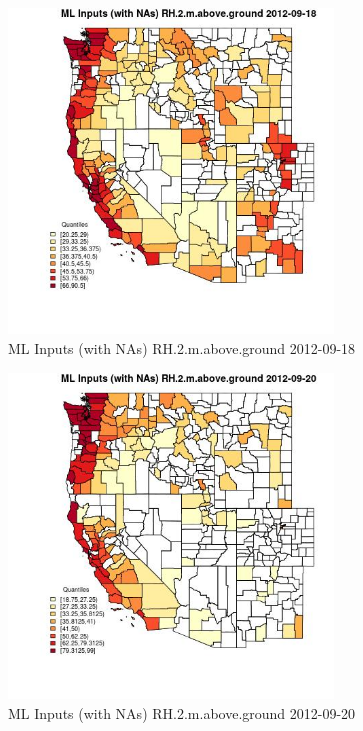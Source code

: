 \begin{figure} 
\centering  
\includegraphics[width=0.77\textwidth]{Code_Outputs/Report_ML_input_PM25_Step4_part_e_de_duplicated_aves_compiled_2019-05-14wNAs_CountyRH2mabovegroundMean2012-09-18_2012-09-18.jpg} 
\caption{\label{fig:Report_ML_input_PM25_Step4_part_e_de_duplicated_aves_compiled_2019-05-14wNAsCountyRH2mabovegroundMean2012-09-18_2012-09-18}ML Inputs (with NAs) RH.2.m.above.ground 2012-09-18} 
\end{figure} 
 

\clearpage 

\begin{figure} 
\centering  
\includegraphics[width=0.77\textwidth]{Code_Outputs/Report_ML_input_PM25_Step4_part_e_de_duplicated_aves_compiled_2019-05-14wNAs_CountyRH2mabovegroundMean2012-09-20_2012-09-20.jpg} 
\caption{\label{fig:Report_ML_input_PM25_Step4_part_e_de_duplicated_aves_compiled_2019-05-14wNAsCountyRH2mabovegroundMean2012-09-20_2012-09-20}ML Inputs (with NAs) RH.2.m.above.ground 2012-09-20} 
\end{figure} 
 

